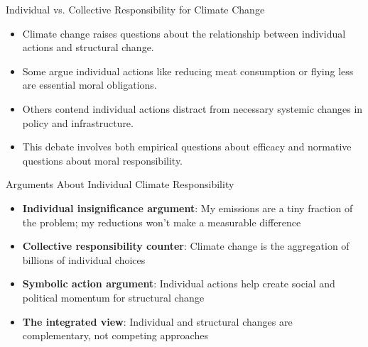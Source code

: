 \documentclass{beamer}
\begin{document}
	\begin{frame}{Individual vs. Collective Responsibility for Climate Change}
		\begin{itemize}
			\item Climate change raises questions about the relationship between individual actions and structural change.
			\item Some argue individual actions like reducing meat consumption or flying less are essential moral obligations.
			\item Others contend individual actions distract from necessary systemic changes in policy and infrastructure.
			\item This debate involves both empirical questions about efficacy and normative questions about moral responsibility.
		\end{itemize}
		
		\begin{block}{Arguments About Individual Climate Responsibility}
			\scriptsize
			\begin{itemize}
				\item \textbf{Individual insignificance argument}: My emissions are a tiny fraction of the problem; my reductions won't make a measurable difference
				\item \textbf{Collective responsibility counter}: Climate change is the aggregation of billions of individual choices
				\item \textbf{Symbolic action argument}: Individual actions help create social and political momentum for structural change
				\item \textbf{The integrated view}: Individual and structural changes are complementary, not competing approaches
			\end{itemize}
		\end{block}
	\end{frame}
	
\end{document}
